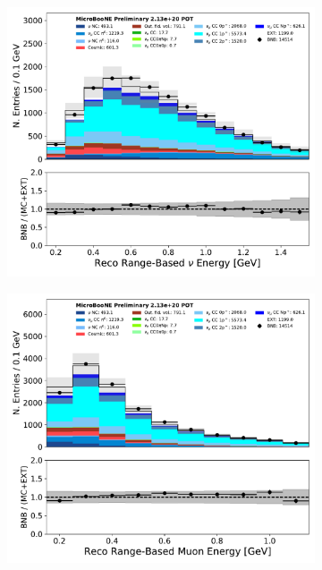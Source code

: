 \begin{figure}[hbt!] 
\begin{center}
    \begin{subfigure}[b]{0.3\textwidth}
    \centering
    \includegraphics[width=1.00\textwidth]{NuMuCCsel/Images/Ryan/fullselection_run3_fullsystematics/reco_nu_e_range_v_07232020_fullsel_samples_detsys_event_category.pdf}
    \caption{\label{fig:NuMUCCsel:ryan:run3kinematics:nuE}}
    \end{subfigure}
    \begin{subfigure}[b]{0.3\textwidth}
    \centering
    \includegraphics[width=1.00\textwidth]{NuMuCCsel/Images/Ryan/fullselection_run3_fullsystematics/trk_range_muon_e_v_07232020_fullsel_samples_detsys_event_category.pdf}

\end{subfigure}
\end{center}
\end{figure}
